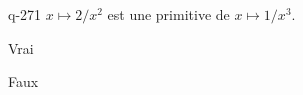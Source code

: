 \begin{truefalse}{q-271}
$x\mapsto 2/x^2$ est une primitive de $x\mapsto 1/x^3$.
\item Vrai
\item* Faux
\end{truefalse}

